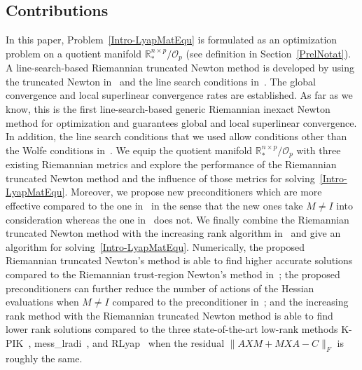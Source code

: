\documentclass[11pt]{article}
\newcommand{\zwhcomm}[2]{{\sf\color{purple} #1}{\sf\color{blue} #2}}
\numberwithin{equation}{section}
\begin{document}
\subsection{Contributions}

In this paper, Problem~\eqref{Intro-LyapMatEqu} is formulated as an optimization problem on a quotient manifold $\mathbb{R}_*^{n \times p} / \mathcal{O}_p$ (see definition in Section~\ref{PrelNotat}). A line-search-based Riemannian truncated Newton method is developed by using the truncated Newton in~\cite{dembo_truncated-newton_1983} and the line search conditions in~\cite{Byrd1989ATF}. The global convergence and local superlinear convergence rates are established. As far as we know, this is the first line-search-based generic Riemannian inexact Newton method for optimization and guarantees global and local superlinear convergence. In addition, the line search conditions that we used allow conditions other than the Wolfe conditions in~\cite{dembo_truncated-newton_1983}. We equip the quotient manifold $\mathbb{R}_*^{n \times p} / \mathcal{O}_p$ with three existing Riemannian metrics and explore the performance of the Riemannian truncated Newton method and the influence of those metrics for solving~\eqref{Intro-LyapMatEqu}. Moreover, we propose new preconditioners which are more effective compared to the one in~\cite{Bart10} in the sense that the new ones take $M \neq I$ into consideration whereas the one in~\cite{Bart10} does not. We finally combine the Riemannian truncated Newton method with the increasing rank algorithm in~\cite{Bart10} and give an algorithm for solving~\eqref{Intro-LyapMatEqu}.
Numerically, the proposed Riemannian truncated Newton's method is able to find higher accurate solutions compared to the Riemannian trust-region Newton's method in~\cite{Absil2007TrustRegionMO}; the proposed preconditioners can further reduce the number of actions of the Hessian evaluations when $M \neq I$ compared to the preconditioner in~\cite{Bart10}; and the increasing rank method with the Riemannian truncated Newton method is able to find lower rank solutions compared to the three state-of-the-art low-rank methods K-PIK~\cite{simoncini_new_2007}, mess\_lradi~\cite{SaaKB21-mmess-2.2}, and RLyap~\cite{Bart10} when the residual $\|AXM+MXA-C\|_F$ is roughly the same.

\end{document}
